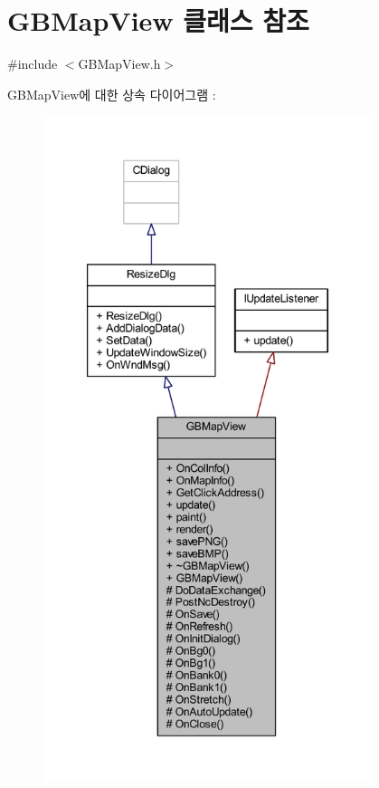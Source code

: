 \hypertarget{class_g_b_map_view}{}\section{G\+B\+Map\+View 클래스 참조}
\label{class_g_b_map_view}


{\ttfamily \#include $<$G\+B\+Map\+View.\+h$>$}



G\+B\+Map\+View에 대한 상속 다이어그램 \+: \nopagebreak
\begin{figure}[H]
\begin{center}
\leavevmode
\includegraphics[height=550pt]{class_g_b_map_view__inherit__graph}
\end{center}
\end{figure}


